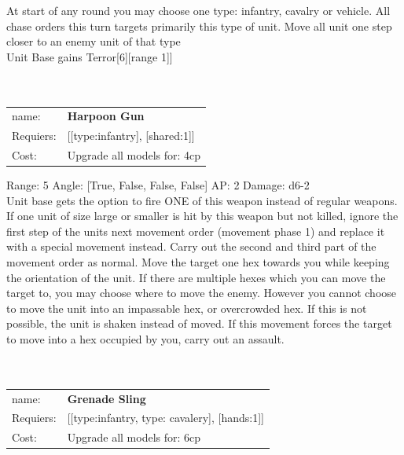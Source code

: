At start of any round you may choose one type: infantry, cavalry or vehicle. All chase orders this turn targets primarily this type of unit. Move all unit one step closer to an enemy unit of that type\\ 
Unit Base gains Terror[6][range 1]]\\ 









\ \\
\ \\
\begin{tabular}{ll}
name: & {\bf Harpoon Gun } \\
Requiers: & [[type:infantry], [shared:1]] \\
Cost: & Upgrade all models for: 4cp \\
\end{tabular}



Range: 5  Angle: [True, False, False, False] AP: 2 Damage: d6-2 \\
Unit base gets the option to fire ONE of this weapon instead of regular weapons.\\ 
If one unit of size large or smaller is hit by this weapon but not killed, ignore the first step of the units next movement order (movement phase 1) and replace it with a special movement instead. Carry out the second and third part of the movement order as normal. Move the target one hex towards you while keeping the orientation of the unit. If there are multiple hexes which you can move the target to, you may choose where to move the enemy. However you cannot choose to move the unit into an impassable hex, or overcrowded hex. If this is not possible, the unit is shaken instead of moved. If this movement forces the target to move into a hex occupied by you, carry out an assault.\\ 








\ \\
\ \\
\begin{tabular}{ll}
name: & {\bf Grenade Sling } \\
Requiers: & [[type:infantry, type: cavalery], [hands:1]] \\
Cost: & Upgrade all models for: 6cp \\
\end{tabular}



